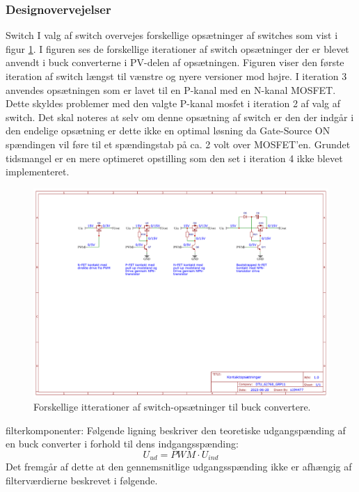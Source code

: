 \documentclass[../main.tex]{subfiles}
\begin{document}
        \subsubsection{Designovervejelser}
            
            
            Switch
            I valg af switch overvejes forskellige opsætninger af switches som vist i figur \ref{fig: Switch designs}. I figuren ses de forskellige iterationer af switch opsætninger der er blevet anvendt i buck converterne i PV-delen af opsætningen. Figuren viser den første iteration af switch længst til vænstre og nyere versioner mod højre.
            \newline
            I iteration 3 anvendes opsætningen som er lavet til en P-kanal med en N-kanal MOSFET. Dette skyldes problemer med den valgte P-kanal mosfet i iteration 2 af valg af switch. Det skal noteres at selv om denne opsætning af switch er den der indgår i den endelige opsætning er dette ikke en optimal løsning da Gate-Source ON spændingen vil føre til et spændingstab på ca. 2 volt over MOSFET'en. Grundet tidsmangel er en mere optimeret opstilling som den set i iteration 4 ikke blevet implementeret.\newline
            
            \begin{figure}[H]
            \includegraphics[width=\textwidth]{Dokumentation/Figures/PV_Converter switches.png}
            \caption{Forskellige itterationer af switch-opsætninger til buck convertere.}
            \label{fig: Switch designs}
            \end{figure}
            
            filterkomponenter:
                Følgende ligning beskriver den teoretiske udgangspænding af en buck converter i forhold til dens indgangsspænding:\newline
                $$U_{ud} = PWM \cdot U_{ind} $$\newline
                Det fremgår af dette at den gennemsnitlige udgangsspænding ikke er afhængig af filterværdierne beskrevet i følgende.
            
\end{document}

